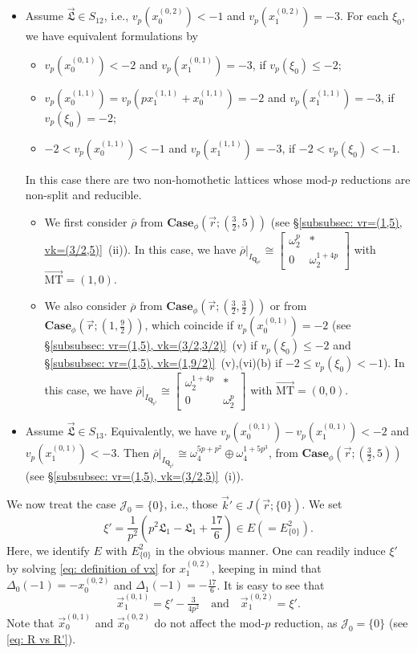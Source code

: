 \documentclass[11pt]{amsart}
\theoremstyle{definition}
\numberwithin{equation}{subsection}
\theoremstyle{plain}
\theoremstyle{plain}
\theoremstyle{plain}
\theoremstyle{plain}
\theoremstyle{plain}
\theoremstyle{plain}
\theoremstyle{plain}
\theoremstyle{plain}
\theoremstyle{plain}
\theoremstyle{plain}
\theoremstyle{plain}
\theoremstyle{plain}
\theoremstyle{definition}
\theoremstyle{definition}
\theoremstyle{definition}
\theoremstyle{remark}
\renewcommand{\(}{\textup{(}}
\renewcommand{\)}{\textup{)}}
\newcommand{\Q}{\mathbf{Q}}
\newcommand{\rhobar}{\overline{\rho}}
\newcommand{\fL}{\mathfrak{L}}
\newcommand{\cJ}{\mathcal{J}}
\newcommand{\vx}{\vec{x}}
\newcommand{\vr}{\vec{r}}
\newcommand{\vL}{\vec{\fL}}
\newcommand{\vk}{\vec{k}}
\newcommand{\IQptwo}{{I_{\Q_{p^2}}}}
\begin{document}
\begin{itemize}[leftmargin=*]
\item Assume $\vL\in S_{12}$, i.e., $v_p(x_0^{(0,2)})<-1$ and $v_p(x_1^{(0,2)})=-3$. For each $\xi_0$, we have equivalent formulations by
\begin{itemize}[leftmargin=*]
    \item $v_p(x_0^{(0,1)})<-2$ and $v_p(x_1^{(0,1)})=-3$, if $v_p(\xi_0)\leq -2$;
    \item $v_p(x_0^{(1,1)})=v_p(px_1^{(1,1)}+x_0^{(1,1)})=-2$ and $v_p(x_1^{(1,1)})=-3$, if $v_p(\xi_0)=-2$;
    \item $-2<v_p(x_0^{(1,1)})<-1$ and $v_p(x_1^{(1,1)})=-3$, if $-2<v_p(\xi_0)<-1$.
\end{itemize}
In this case there are two non-homothetic lattices whose mod-$p$ reductions are non-split and reducible.
\begin{itemize}[leftmargin=*]
    \item We first consider $\rhobar$ from $\mathbf{Case}_\phi(\vr;(\frac{3}{2},5))$ (see \S\ref{subsubsec: vr=(1,5), vk=(3/2,5)}~(ii)). In this case, we have $\rhobar|_\IQptwo\cong
    \begin{bmatrix}
        \omega_2^p & * \\ 0 & \omega_2^{1+4p}
    \end{bmatrix}$ with $\vec{\mathrm{MT}}=(1,0)$.
    \item We also consider $\rhobar$ from $\mathbf{Case}_\phi(\vr;(\frac{3}{2},\frac{3}{2}))$ or from $\mathbf{Case}_\phi(\vr;(1,\frac{9}{2}))$, which coincide if $v_p(x_0^{(0,1)})=-2$ (see \S\ref{subsubsec: vr=(1,5), vk=(3/2,3/2)}~(v) if $v_p(\xi_0)\leq -2$ and \S\ref{subsubsec: vr=(1,5), vk=(1,9/2)}~(v),(vi)(b) if $-2\leq v_p(\xi_0)<-1$). In this case, we have $\rhobar|_\IQptwo\cong
    \begin{bmatrix}
        \omega_2^{1+4p} & * \\ 0 & \omega_2^p
    \end{bmatrix}$ with $\vec{\mathrm{MT}}=(0,0)$.
\end{itemize}

\item Assume $\vL\in S_{13}$. Equivalently, we have $v_p(x_0^{(0,1)})-v_p(x_1^{(0,1)})<-2$ and $v_p(x_1^{(0,1)})<-3$. Then $\rhobar|_\IQptwo\cong\omega_4^{5p+p^2}\oplus\omega_4^{1+5p^3}$, from $\mathbf{Case}_\phi(\vr;(\frac{3}{2},5))$ (see \S\ref{subsubsec: vr=(1,5), vk=(3/2,5)}~(i)).
\end{itemize}

\smallskip
We now treat the case $\cJ_0=\{0\}$, i.e., those $\vk'\in J(\vr;\{0\})$. We set $$\xi'=\frac{1}{p^2}\left(p^2\fL_1-\fL_1+\frac{17}{6}\right)\in E(= E^2_{\{0\}}).$$
Here, we identify $E$ with $E^2_{\{0\}}$ in the obvious manner. One can readily induce $\xi'$ by solving \eqref{eq: definition of vx} for $x^{(0,2)}_1$, keeping in mind that $\Delta_0(-1)=-x_0^{(0,2)}$ and $\Delta_1(-1)=-\frac{17}{6}$. It is easy to see that
$$\vx^{(0,1)}_1=\xi'-\tfrac{3}{4p^2}
\quad\mbox{and}\quad
\vx^{(0,2)}_1=\xi'.$$
Note that $\vx^{(0,1)}_0$ and $\vx^{(0,2)}_0$ do not affect the mod-$p$ reduction, as $\cJ_0=\{0\}$ (see \eqref{eq: R vs R'}). 
\end{document}
